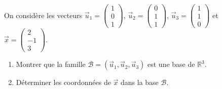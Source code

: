 \documentclass[11pt]{article}
\begin{document}
\begin{exercice}
On considère les vecteurs $\vec{u}_1 = \begin{pmatrix} 1 \\ 0 \\ 1 \end{pmatrix}$, $\vec{u}_2 = \begin{pmatrix} 0 \\ 1 \\ 1 \end{pmatrix}$, $\vec{u}_3 = \begin{pmatrix} 1 \\ 1 \\ 0 \end{pmatrix}$ et $\vec{x} = \begin{pmatrix} 2 \\ -1 \\ 3 \end{pmatrix}$.
\begin{enumerate}
    \item Montrer que la famille $\mathcal{B} = (\vec{u}_1, \vec{u}_2, \vec{u}_3)$ est une base de $\mathbb{R}^3$.
    \item Déterminer les coordonnées de $\vec{x}$ dans la base $\mathcal{B}$.
\end{enumerate}
\end{exercice}
\end{document}
